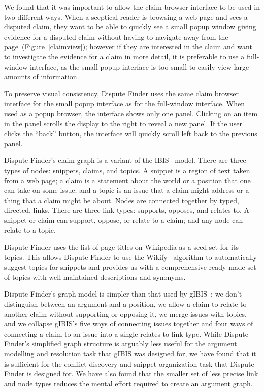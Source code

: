 \documentclass{www2010-submission}
\newcommand{\todo}[1]{{[\color{blue} TODO: #1]}}
\begin{document}
We found that it was important to allow the claim browser interface to be used in two different ways. When a sceptical reader is browsing a web page and sees a disputed claim, they want to be able to quickly see a small popup window giving evidence for a disputed claim without having to navigate away from the page~(Figure~\ref{claimview}); however if they are interested in the claim and want to investigate the evidence for a claim in more detail, it is preferable to use a full-window interface, as the small popup interface is too small to easily view large amounts of information.

To preserve visual consistency, Dispute Finder uses the same claim browser interface for the small popup interface as for the full-window interface. When used as a popup browser, the interface shows only one panel. Clicking on an item in the panel scrolls the display to the right to reveal a new panel. If the user clicks the ``back'' button, the interface will quickly scroll left back to the previous panel.


Dispute Finder's claim graph is a variant of the IBIS~\cite{Rittel1973} model. There are three types of nodes: snippets, claims, and topics. 
A snippet is a region of text taken from a web page; a claim is a statement about the world or a position that one can take on some issue; and a topic is an issue that a claim might address or a thing that a claim might be about. Nodes are connected together by typed, directed, links. 
There are three link types: supports, opposes, and relates-to. A snippet or claim can support, oppose, or relate-to a claim; and any node can relate-to a topic. 

Dispute Finder uses the list of page titles on Wikipedia as a seed-set for its topics. This allows Dispute Finder to use the Wikify~\cite{Mihalcea2007} algorithm to automatically suggest topics for snippets and provides us with a comprehensive ready-made set of topics with well-maintained descriptions and synonyms.

Dispute Finder's graph model is simpler than that used by gIBIS~\cite{Conklin1987a}: we don't distinguish between an argument and a position, we allow a claim to relate-to another claim without supporting or opposing it, we merge issues with topics, and we collapse gIBIS's five ways of connecting issues together and four ways of connecting a claim to an issue into a single relates-to link type. 
While Dispute Finder's simplified graph structure is arguably less useful for the argument modelling and resolution task that gIBIS was designed for, we have found that it is sufficient for the conflict discovery and snippet organization task that Dispute Finder is designed for. 
We have also found that the smaller set of less precise link and node types reduces the mental effort required to create an argument graph.
\end{document}
